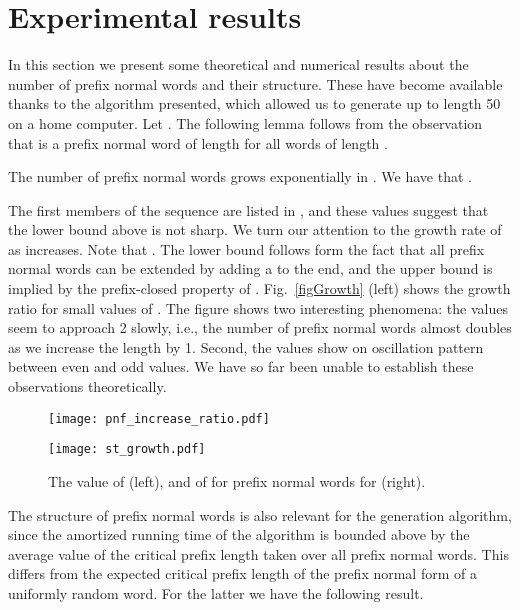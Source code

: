 \documentclass[11pt,a4paper]{llncs}
\begin{document}
\section{Experimental results}
\newcommand{\pnn}{\ensuremath{\textit{pnw}}}

In this section we present some theoretical and numerical results about the number of prefix normal words and their structure. These have become available thanks to the algorithm presented, which allowed us to generate  up to length 50 on a home computer. 
Let . The following lemma follows from the observation that  is a prefix normal word of length  for all words  of length .

\begin{lemma}
The number of prefix normal words grows exponentially in . We have that . 
\end{lemma}

The first members of the sequence  are listed in \cite{sloane2}, and these values suggest that the lower bound above is not sharp. We turn our attention to the growth rate of  as  increases. Note that . The lower bound follows form the fact that all prefix normal words can be extended by adding a  to the end, and the upper bound is implied by the prefix-closed property of .  Fig.~\ref{figGrowth} (left) shows the growth ratio for small values of . The figure shows two interesting phenomena: the values seem to approach 2 slowly, i.e., the number of prefix normal words almost doubles as we increase the length by 1. Second, the values show on oscillation pattern between even and odd values. We have so far been unable to establish these observations theoretically.

\begin{figure}
\begin{minipage}[c]{8cm}
\begin{center}
\texttt{[image: pnf\_increase\_ratio.pdf]}
\end{center}
\end{minipage}
\begin{minipage}[c]{8cm}
\begin{center}
\texttt{[image: st\_growth.pdf]}
\end{center}
\end{minipage}
\caption{The value of  (left), and of  for prefix normal words for  (right).} 
\label{figGrowth}
\label{figSTGrowth}
\end{figure}

The structure of prefix normal words is also relevant for the generation algorithm, since the amortized running time of the algorithm is bounded above by the average value of the critical prefix length  taken over all prefix normal words. This differs from the expected critical prefix length of the prefix normal form of a uniformly random word. For the latter we have the following result.
\end{document}
